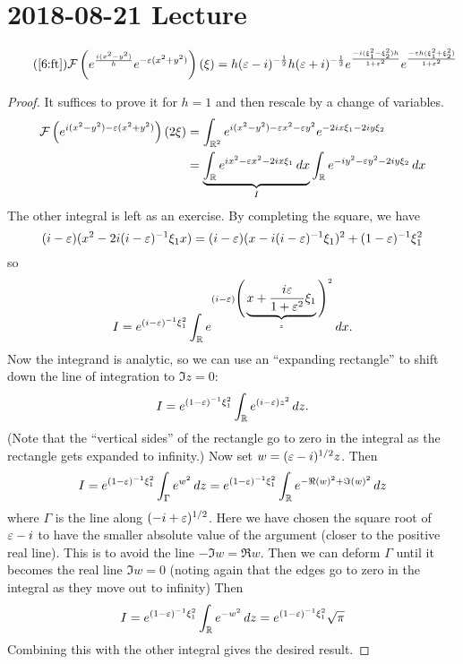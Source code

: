 \section{2018-08-21 Lecture}

\begin{lem}
  \begin{equation}\tag{\ref{6:ft}}
    \cF \left( e^{\frac{i(x^2-y^2)}{h}}e^{-\eps(x^2+y^2)} \right) (\xi) = h(\eps-i)^{-\frac{1}{2}}h(\eps+i)^{-\frac{1}{2}}e^{\frac{-i(\xi_1^2-\xi_2^2)h}{1+\eps^2}}e^{\frac{-\eps h(\xi_1^2+\xi_2^2)}{1+\eps^2}}
  \end{equation}
\end{lem}

\begin{proof}
  It suffices to prove it for $h=1$ and then rescale by a change of variables.
  \begin{align*}
    \mathcal{F}\left( e^{i(x^2-y^2)-\varepsilon(x^2+y^2)} \right)(2\xi) &= \int_{\mathbb{R}^2} e^{i(x^2-y^2)-\varepsilon x^2-\varepsilon y^2}e^{-2ix\xi_1-2iy\xi_2} \\
    &= \underbrace{\int_{\mathbb{R}} e^{ix^2-\varepsilon x^2-2ix\xi_1} \, dx}_I \int_{\mathbb{R}} e^{-iy^2-\varepsilon y^2-2iy\xi_2} \, dx
  \end{align*}
  The other integral is left as an exercise.
  By completing the square, we have
  \[ (i-\varepsilon)(x^2-2i(i-\varepsilon)^{-1}\xi_1x)=(i-\varepsilon)(x-i(i-\varepsilon)^{-1}\xi_1)^2 + (1-\varepsilon)^{-1}\xi_1^2\]
  so
  \[ I = e^{(i-\varepsilon)^{-1}\xi_1^2} \int_{\mathbb{R}} e^{(i-\varepsilon) { \Bigg( \underbrace{ x+\frac{i\varepsilon}{1+\varepsilon^2}\xi_1}_{z}\Bigg)^2 }} \, dx. \]
  Now the integrand is analytic, so we can use an ``expanding rectangle'' to shift down the line of integration to $\Im z=0$:
  \[ I = e^{(1-\varepsilon)^{-1}\xi_1^2} \int_{\mathbb{R}} e^{(i-\varepsilon)z^2} \, dz. \]
  (Note that the ``vertical sides'' of the rectangle go to zero in the integral as the rectangle gets expanded to infinity.)
  Now set $w = (\varepsilon-i)^{1/2}z$.
  Then
  \[ I = e^{(1-\varepsilon)^{-1}\xi_1^2} \int_\Gamma e^{w^2} \, dz = e^{(1-\varepsilon)^{-1}\xi_1^2} \int_{\mathbb{R}} e^{-\Re(w)^2+\Im(w)^2} \, dz \]
  where $\Gamma$ is the line along $(-i+\varepsilon)^{1/2}$.
  Here we have chosen the square root of $\varepsilon-i$ to have the smaller absolute value of the argument (closer to the positive real line).
  This is to avoid the line $-\Im w = \Re w$.
  Then we can deform $\Gamma$ until it becomes the real line $\Im w=0$ (noting again that the edges go to zero in the integral as they move out to infinity)
  Then
  \[ I = e^{(1-\varepsilon)^{-1}\xi_1^2} \int_{\mathbb{R}} e^{-w^2} \, dz = e^{(1-\varepsilon)^{-1}\xi_1^2}\sqrt{\pi}  \]
  Combining this with the other integral gives the desired result.
\end{proof}

